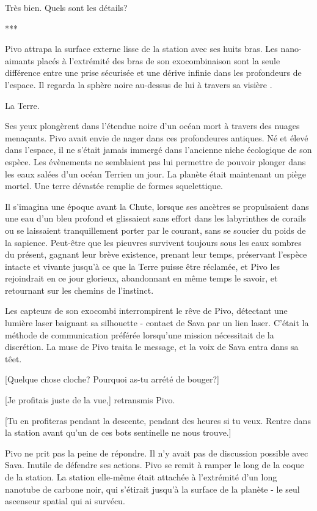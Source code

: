 Très bien. Quels sont les détails? 

\begin{center} *** \end{center} 

Pivo attrapa la surface externe lisse de la station avec ses huits bras. Les nano-aimants placés à l'extrémité des bras de son exocombinaison sont la seule différence entre une prise sécurisée et une dérive infinie dans les profondeurs de l'espace. Il regarda la sphère noire au-dessus de lui à travers sa visière . 

La Terre. 

Ses yeux plongèrent dans l'étendue noire d'un océan mort à travers des nuages menaçants. Pivo avait envie de nager dans ces profondeures antiques. Né et élevé dans l'espace, il ne s'était jamais immergé dans l'ancienne niche écologique de son espèce. Les évènements ne semblaient pas lui permettre de pouvoir plonger dans les eaux salées d'un océan Terrien un jour. La planète était maintenant un piège mortel. Une terre dévastée remplie de formes squelettique. 

Il s'imagina une époque avant la Chute, lorsque ses ancètres se propulsaient dans une eau d'un bleu profond et glissaient sans effort dans les labyrinthes de corails ou se laissaient tranquillement porter par le courant, sans se soucier du poids de la sapience. Peut-être que les pieuvres survivent toujours sous les eaux sombres du présent, gagnant leur brève existence, prenant leur temps, préservant l'espèce intacte et vivante jusqu'à ce que la Terre puisse être réclamée, et Pivo les rejoindrait en ce jour glorieux, abandonnant en même temps le savoir, et retournant sur les chemins de l'instinct. 

Les capteurs de son exocombi interrompirent le rêve de Pivo, détectant une lumière laser baignant sa silhouette - contact de Sava par un lien laser. C'était la méthode de communication préférée lorsqu'une mission nécessitait de la discrétion. La muse de Pivo traita le message, et la voix de Sava entra dans sa têet. 

[Quelque chose cloche? Pourquoi as-tu arrété de bouger?] 

[Je profitais juste de la vue,] retransmis Pivo. 

[Tu en profiteras pendant la descente, pendant des heures si tu veux. Rentre dans la station avant qu'un de ces bots sentinelle ne nous trouve.] 

Pivo ne prit pas la peine de répondre. Il n'y avait pas de discussion possible avec Sava. Inutile de défendre ses actions. Pivo se remit à ramper le long de la coque de la station. La station elle-même était attachée à l'extrémité d'un long nanotube de carbone noir, qui s'étirait jusqu'à la surface de la planète - le seul ascenseur spatial qui ai survécu. 

